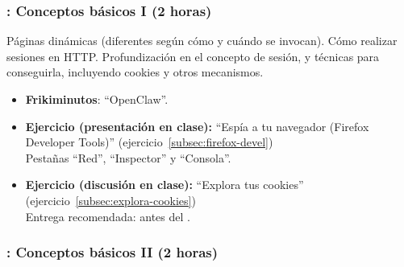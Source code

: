 \documentclass[a4paper,12pt]{article}
\begin{document}
\subsubsection{\martesB: Conceptos básicos I (2 horas)}
\label{cal:martesB}

Páginas dinámicas (diferentes según cómo y cuándo se invocan). Cómo realizar sesiones en HTTP. Profundización en el concepto de sesión, y técnicas para conseguirla, incluyendo cookies y otros mecanismos.

\begin{itemize}
\item \textbf{Frikiminutos}: ``OpenClaw''.
\item \textbf{Ejercicio (presentación en clase):} ``Espía a tu navegador (Firefox Developer Tools)'' (ejercicio~\ref{subsec:firefox-devel}) \\
  Pestañas ``Red'', ``Inspector'' y ``Consola''.
\item \textbf{Ejercicio (discusión en clase):} ``Explora tus cookies'' (ejercicio~\ref{subsec:explora-cookies}) \\
  Entrega recomendada: antes del \martesC.
\end{itemize}


\subsubsection{\martesC: Conceptos básicos II (2 horas)}
\label{cal:martesC}
\end{document}
